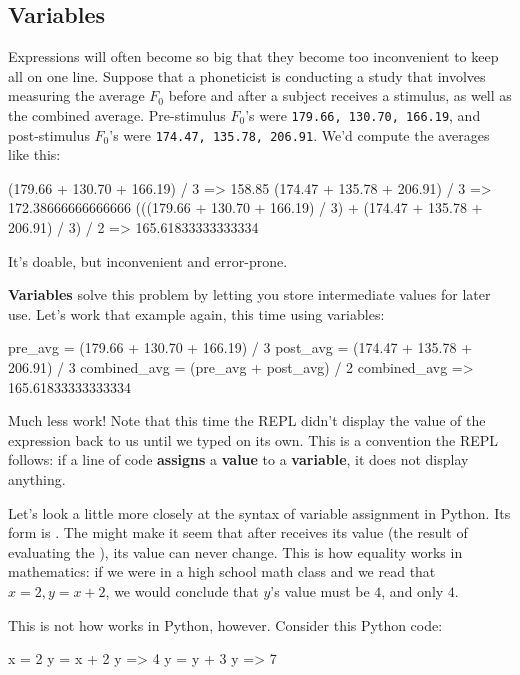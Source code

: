 \documentclass{article}
\newcommand\pyi\pythoninline
\begin{document}
\subsection{Variables}

Expressions will often become so big that they become too inconvenient to keep all on one line. Suppose that a phoneticist is conducting a study that involves measuring the average $F_0$ before and after a subject receives a stimulus, as well as the combined average. Pre-stimulus $F_0$'s were {\tt 179.66, 130.70, 166.19}, and post-stimulus $F_0$'s were {\tt 174.47, 135.78, 206.91}. We'd compute the averages like this:

\begin{python}
(179.66 + 130.70 + 166.19) / 3
=> 158.85
(174.47 + 135.78 + 206.91) / 3
=> 172.38666666666666
(((179.66 + 130.70 + 166.19) / 3) 
+ (174.47 + 135.78 + 206.91) / 3) / 2
=> 165.61833333333334
\end{python}

\noindent It's doable, but inconvenient and error-prone. 

\textbf{Variables} solve this problem by letting you store intermediate values for later use. Let's work that example again, this time using variables:

\begin{python}
pre_avg = (179.66 + 130.70 + 166.19) / 3
post_avg = (174.47 + 135.78 + 206.91) / 3
combined_avg = (pre_avg + post_avg) / 2
combined_avg
=> 165.61833333333334
\end{python}

\noindent Much less work! Note that this time the REPL didn't display the value of the expression back to us until we typed \pyi{total_avg} on its own. This is a convention the REPL follows: if a line of code \textbf{assigns} a \textbf{value} to a \textbf{variable}, it does not display anything.

Let's look a little more closely at the syntax of variable assignment in Python. Its form is \pyi{var = expr}. The \pyi{=} might make it seem that after \pyi{var} receives its value (the result of evaluating the \pyi{expr}), its value can never change. This is how equality works in mathematics: if we were in a high school math class and we read that $x = 2, y = x + 2$, we would conclude that $y$'s value must be $4$, and only $4$. 

This is not how \pyi{=} works in Python, however. Consider this Python code:

\begin{python}
x = 2
y = x + 2
y
=> 4
y = y + 3
y
=> 7
\end{python}
\end{document}
